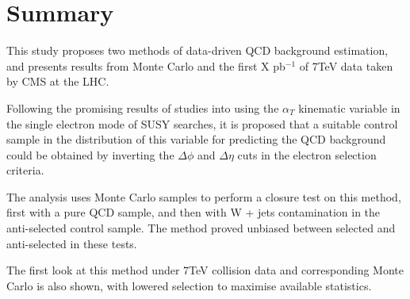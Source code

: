 \section{Summary}
\label{sec:Summary}

This study proposes two methods of data-driven QCD background estimation, and presents results from Monte Carlo and the first X pb$^{-1}$ of 7TeV data taken by CMS at the LHC. 

Following the promising results of studies into using the $\alpha_{T}$  kinematic variable in the single electron mode of SUSY searches, it is proposed that a suitable control sample in the distribution of this variable for predicting the QCD background could be obtained by inverting the $\Delta \phi$ and $\Delta \eta$ cuts in the electron selection criteria. 

The analysis uses Monte Carlo samples to perform a closure test on this method, first with a pure QCD sample, and then with W + jets contamination in the anti-selected control sample. The method proved unbiased between selected and anti-selected in these tests. 

The first look at this method under 7TeV collision data and corresponding Monte Carlo is also shown, with lowered selection to maximise available statistics.
